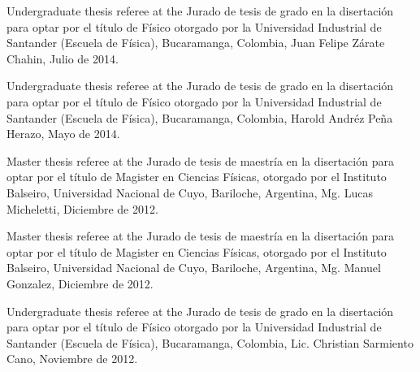 

\ifeng
Undergraduate thesis referee at the
\else
Jurado de tesis de grado en la 
\fi
disertación para optar por el título de Físico otorgado por la Universidad Industrial de Santander (Escuela de Física), Bucaramanga, Colombia, Juan Felipe Zárate Chahin, Julio de 2014.

\ifeng
Undergraduate thesis referee at the
\else
Jurado de tesis de grado en la 
\fi
disertación para optar por el título de Físico otorgado por la Universidad Industrial de Santander (Escuela de Física), Bucaramanga, Colombia, Harold Andréz Peña Herazo, Mayo de 2014.

\ifeng
Master thesis referee at the
\else
Jurado de tesis de maestría en la 
\fi
disertación para optar por el título de Magister en Ciencias Físicas, otorgado por el Instituto Balseiro, Universidad Nacional de Cuyo, Bariloche, Argentina, Mg. Lucas Micheletti, Diciembre de 2012.

\ifeng
Master thesis referee at the
\else
Jurado de tesis de maestría en la 
\fi
disertación para optar por el título de Magister en Ciencias Físicas, otorgado por el Instituto Balseiro, Universidad Nacional de Cuyo, Bariloche, Argentina, Mg. Manuel Gonzalez, Diciembre de 2012.

\ifeng
Undergraduate thesis referee at the
\else
Jurado de tesis de grado en la 
\fi
disertación para optar por el título de Físico otorgado por la Universidad Industrial de Santander (Escuela de Física), Bucaramanga, Colombia, Lic. Christian Sarmiento Cano, Noviembre de 2012.
